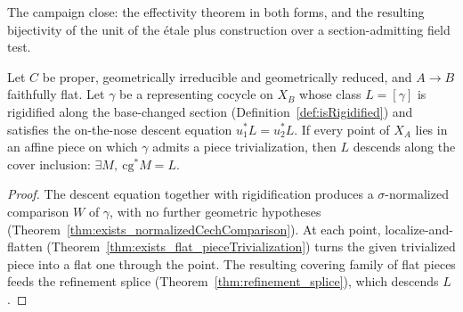 The campaign close: the effectivity theorem in both forms, and the resulting bijectivity of the unit
of the \'etale plus construction over a section-admitting field test.

\begin{theorem}
  \label{thm:effectivity_of_pieces}
  \leanok
  Let \(C\) be proper, geometrically irreducible and geometrically reduced, and \(A \to B\)
  faithfully flat. Let \(\gamma\) be a representing cocycle on \(X_B\) whose class \(L = [\gamma]\) is
  rigidified along the base-changed section (Definition~\ref{def:isRigidified}) and satisfies the
  on-the-nose descent equation \(u_1^{*}L = u_2^{*}L\). If every point of \(X_A\) lies in an affine
  piece on which \(\gamma\) admits a piece trivialization, then \(L\) descends along the cover
  inclusion: \(\exists M,\ \mathrm{cg}^{*}M = L\).
\end{theorem}
\begin{proof}
  \leanok
  The descent equation together with rigidification produces a \(\sigma\)-normalized comparison \(W\)
  of \(\gamma\), with no further geometric hypotheses
  (Theorem~\ref{thm:exists_normalizedCechComparison}). At each point, localize-and-flatten
  (Theorem~\ref{thm:exists_flat_pieceTrivialization}) turns the given trivialized piece into a flat
  one through the point. The resulting covering family of flat pieces feeds the refinement splice
  (Theorem~\ref{thm:refinement_splice}), which descends \(L\).
\end{proof}

